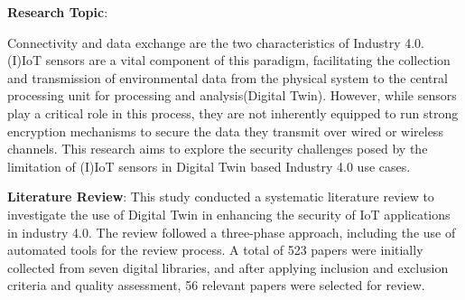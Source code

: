 

\textbf{Research Topic}:
% 

Connectivity and data exchange  are the two characteristics of Industry 4.0. (I)IoT sensors are a vital component of this paradigm, facilitating the collection and transmission of environmental data from the physical system to the central processing unit for processing and analysis(Digital Twin). However, while sensors play a critical role in this process, they are not inherently equipped to run strong encryption mechanisms to secure the data they transmit over wired or wireless channels. This research aims to explore the security challenges posed by the limitation of (I)IoT sensors in Digital Twin based Industry 4.0 use cases. 



\textbf{Literature Review}:
This study conducted a systematic literature review to investigate the use of Digital Twin in enhancing the security of IoT applications in industry 4.0. The review followed a three-phase approach, including the use of automated tools for the review process. A total of 523 papers were initially collected from seven digital libraries, and after applying inclusion and exclusion criteria and quality assessment, 56 relevant papers were selected for review. 

